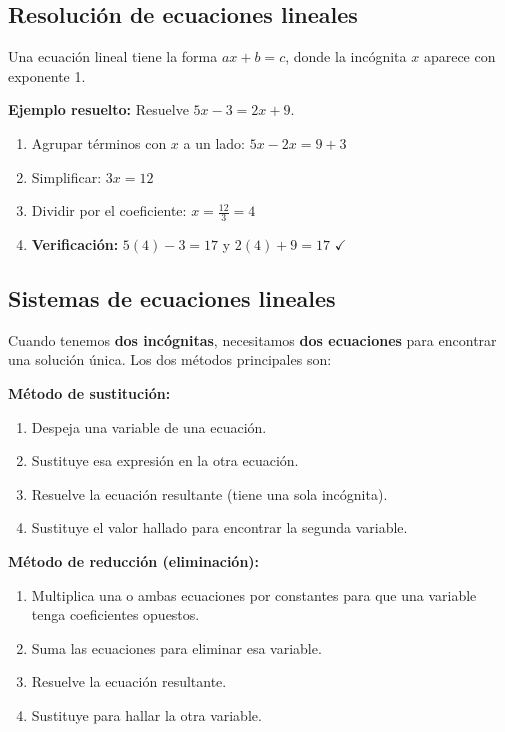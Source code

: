 \documentclass[12pt, a4paper]{article}
\begin{document}
\subsection{Resolución de ecuaciones lineales}

Una ecuación lineal tiene la forma $ax + b = c$, donde la incógnita $x$ aparece con exponente 1.

\noindent\textbf{Ejemplo resuelto:} Resuelve $5x - 3 = 2x + 9$.
\begin{enumerate}
  \item Agrupar términos con $x$ a un lado: $5x - 2x = 9 + 3$
  \item Simplificar: $3x = 12$
  \item Dividir por el coeficiente: $x = \frac{12}{3} = 4$
  \item \textbf{Verificación:} $5(4) - 3 = 17$ y $2(4) + 9 = 17$ $\checkmark$
\end{enumerate}

\subsection{Sistemas de ecuaciones lineales}

Cuando tenemos \textbf{dos incógnitas}, necesitamos \textbf{dos ecuaciones} para encontrar una solución única. Los dos métodos principales son:

\begin{cuadrosolucion}
\textbf{Método de sustitución:}
\begin{enumerate}[leftmargin=*]
  \item Despeja una variable de una ecuación.
  \item Sustituye esa expresión en la otra ecuación.
  \item Resuelve la ecuación resultante (tiene una sola incógnita).
  \item Sustituye el valor hallado para encontrar la segunda variable.
\end{enumerate}
\end{cuadrosolucion}

\begin{cuadroextra}
\textbf{Método de reducción (eliminación):}
\begin{enumerate}[leftmargin=*]
  \item Multiplica una o ambas ecuaciones por constantes para que una variable tenga coeficientes opuestos.
  \item Suma las ecuaciones para eliminar esa variable.
  \item Resuelve la ecuación resultante.
  \item Sustituye para hallar la otra variable.
\end{enumerate}
\end{cuadroextra}
\end{document}
